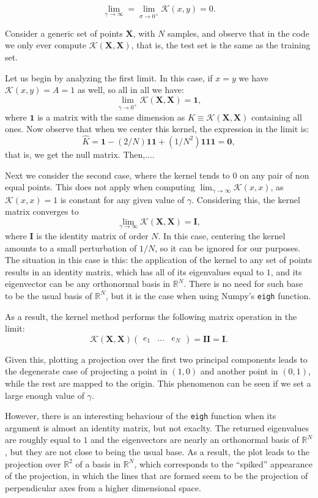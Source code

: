 \documentclass[11pt]{article}
\begin{document}
\[
     \lim_{\gamma \to \infty} = \lim_{\sigma \to 0^{+}} \mathcal{K}(x,y) = 0.
\]

Consider a generic set of points $\bm{X}$, with $N$ samples, and observe that in the code we only ever compute $\mathcal K(\bm X, \bm X)$, that is, the test set is the same as the training set.

Let us begin by analyzing the first limit. In this case, if $x=y$ we have $\mathcal K(x,y)=A=1$ as well, so all in all we have:
\[
\lim_{\gamma\to0^+} \mathcal K(\bm X, \bm X) = \bm 1,
\]
where $\bm 1$ is a matrix with the same dimension as $K\equiv \mathcal K(\bm X, \bm X)$ containing all ones. Now observe that when we center this kernel, the expression in the limit is:
\[
\hat K = \bm 1 - (2/N)\bm 1 \bm 1 + (1/N^2)\bm 1 \bm 1 \bm 1 = \bm 0,
\]
that is, we get the null matrix. Then,....


Next we consider the second case, where the kernel tends to \( 0 \) on any pair of non equal points. This does not apply when computing \( \lim_{\gamma \to \infty} \mathcal{K}(x,x) \), as \( \mathcal{K}(x,x) = 1 \) is constant for any given value of \( \gamma \). Considering this, the kernel matrix converges to
\[
      \lim_{\gamma \to \infty} \mathcal{K}(\bm{X}, \bm{X}) = \bm{I},
\]
where $\bm{I}$ is the identity matrix of order $N$. In this case, centering the kernel amounts to a small perturbation of $1/N$, so it can be ignored for our purposes. The situation in this case is this: the application of the kernel to any set of points results in an identity matrix, which has all of its eigenvalues equal to \( 1 \), and its eigenvector can be any orthonormal basis in \( \mathbb{R}^N \). There is no need for such base to be the usual basis of \( \mathbb{R}^N \), but it is the case when using Numpy's \texttt{eigh} function.

As a result, the kernel method performs the following matrix operation in the limit:
\[
      \mathcal{K}(\bm{X}, \bm{X})\begin{pmatrix} e_1 & \dots & e_N \end{pmatrix} = \bm{I}\bm{I} =  \bm{I}.
\]

Given this, plotting a projection over the first two principal components leads to the degenerate case of projecting a point in \( (1,0) \) and another point in \( (0,1) \), while the rest are mapped to the origin. This phenomenon can be seen if we set a large enough value of $\gamma$.

However, there is an interesting behaviour of the \texttt{eigh} function when its argument is almost an identity matrix, but not exaclty. The returned eigenvalues are roughly equal to \( 1 \) and the eigenvectors are nearly an orthonormal basis of \( \mathbb{R}^N \), but they are not close to being the usual base. As a result, the plot leads to the projection over \( \mathbb{R}^2\) of a basis in \( \mathbb{R}^N \), which corresponds to the ``spiked''  appearance of the projection, in which the lines that are formed seem to be the projection of perpendicular axes from a higher dimensional space.
\end{document}
